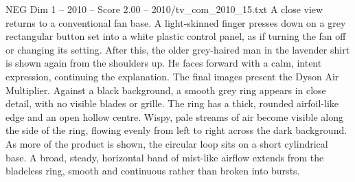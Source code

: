 \begin{textsample}{NEG Dim 1 – 2010 – Score 2.00 – 2010/tv\_com\_2010\_15.txt}
A close view returns to a conventional fan base.
A light-skinned finger presses down on a grey rectangular button set into a white plastic control panel, as if turning the fan off or changing its setting.
After this, the older grey-haired man in the lavender shirt is shown again from the shoulders up.
He faces forward with a calm, intent expression, continuing the explanation.
The final images present the Dyson Air Multiplier.
Against a black background, a smooth grey ring appears in close detail, with no visible blades or grille.
The ring has a thick, rounded airfoil-like edge and an open hollow centre.
Wispy, pale streams of air become visible along the side of the ring, flowing evenly from left to right across the dark background.
As more of the product is shown, the circular loop sits on a short cylindrical base.
A broad, steady, horizontal band of mist-like airflow extends from the bladeless ring, smooth and continuous rather than broken into bursts.

\end{textsample}
